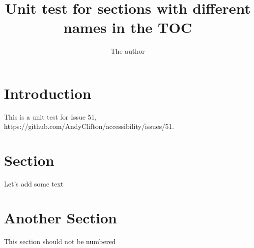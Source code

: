 \documentclass{article}
\title{Unit test for sections with different names in the TOC}
\author{The author}
\begin{document}
\maketitle

\tableofcontents

\section[Introduction]{Introduction}
This is a unit test for Issue 51, https://github.com/AndyClifton/accessibility/issues/51.

\section[Sect.]{Section}
Let's add some text

\section*{Another Section}
This section should not be numbered
\end{document}
